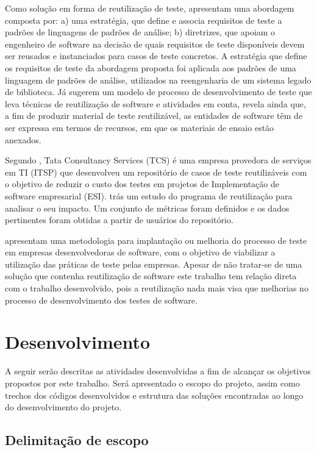\documentclass[tg]{mdtufsm}
\begin{document}
Como solução em forma de reutilização de teste, \cite{cagnin2004reuso} apresentam uma abordagem composta por: a) uma estratégia, que define e associa requisitos de teste a padrões de linguagens de padrões  de análise; b) diretrizes, que apoiam o engenheiro de software na decisão de quais requisitos de teste disponíveis devem ser reusados e instanciados para casos de teste concretos. A estratégia que define os requisitos de teste da abordagem proposta foi aplicada aos padrões de uma
linguagem de padrões de análise, utilizados na reengenharia de um sistema legado de biblioteca. Já \cite{karinsalo2004software} sugerem um modelo de processo de desenvolvimento de teste que leva técnicas de reutilização de software e atividades em conta, revela ainda que, a fim de produzir material de teste reutilizável, as entidades de software têm de ser expressa em termos de recursos, em que os materiais de ensaio estão anexados.

Segundo \cite{patel2014test}, Tata Consultancy Services (TCS)  é uma empresa provedora de serviços em TI (ITSP) que desenvolveu um repositório de casos de teste reutilizáveis com o objetivo de reduzir o custo dos testes em projetos de Implementação de software empresarial (ESI).\cite{patel2014test} trás um estudo do programa de reutilização para analisar o seu impacto. Um conjunto de métricas foram definidos e os dados pertinentes foram obtidas a partir de usuários do repositório.

\cite{crespo2004metodologia} apresentam uma metodologia para implantação ou melhoria do processo de teste em empresas desenvolvedoras de software, com o objetivo de viabilizar a utilização das práticas de teste pelas empresas. Apesar de não tratar-se de uma solução que contenha reutilização de software este trabalho tem relação direta com o trabalho desenvolvido, pois a reutilização nada mais visa que melhorias no processo de desenvolvimento dos testes de software.

\chapter{Desenvolvimento}

A seguir serão descritas as atividades desenvolvidas a fim de alcançar os objetivos propostos por este trabalho. Será apresentado o escopo do projeto, assim como trechos dos códigos desenvolvidos e estrutura das soluções encontradas ao longo do desenvolvimento do projeto.

\section{Delimitação de escopo}
\end{document}
